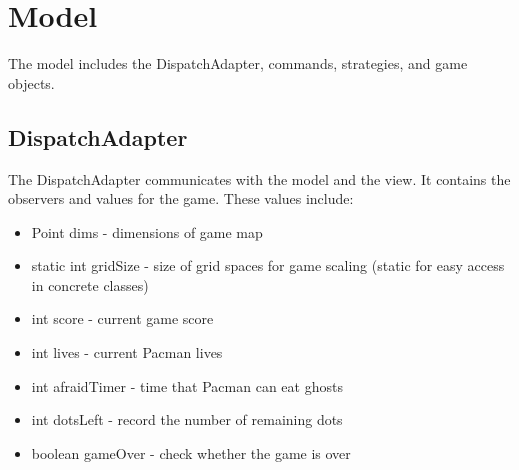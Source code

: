 \documentclass[letterpaper, 11pt]{article}
\begin{document}
\section{Model}
The model includes the DispatchAdapter, commands, strategies, and game objects.

\subsection{DispatchAdapter}
The DispatchAdapter communicates with the model and the view. It contains the observers and values for the game. These values include:
\begin{itemize}
  \item Point dims - dimensions of game map
  \item static int gridSize - size of grid spaces for game scaling (static for easy access in concrete classes)
  \item int score - current game score
  \item int lives - current Pacman lives
  \item int afraidTimer - time that Pacman can eat ghosts 
  \item int dotsLeft - record the number of remaining dots
  \item boolean gameOver - check whether the game is over
\end{itemize}
\end{document}

